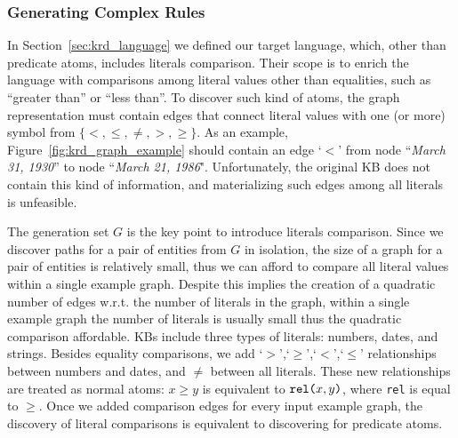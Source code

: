 %
\vspace{-1.5ex}
\subsubsection*{Generating Complex Rules}

\vspace{-1ex}

\vspace{0.5ex}
In Section~\ref{sec:krd_language} we defined our target language, which, other than predicate atoms, includes literals comparison. 
Their scope is to enrich the language with comparisons among literal values other than equalities, such as ``greater than'' or ``less than''. To discover such kind of atoms, the graph representation must contain edges that connect literal values with one (or more) symbol from $\{<,\leq,\neq,>,\geq\}$. As an example, Figure~\ref{fig:krd_graph_example} should contain an edge `$<$' from node ``\textit{March 31, 1930}'' to node ``\textit{March 21, 1986}". Unfortunately, the original KB does not contain this kind of information, and materializing such edges among all literals is unfeasible.

The generation set $G$ is the key point to introduce literals comparison.
Since we discover paths for a pair of entities from $G$ in isolation, the size of a graph for a pair of entities is relatively small, thus we can afford to compare all literal values within a single example graph. Despite this implies the creation of a quadratic number of edges w.r.t. the number of literals in the graph, within a single example graph the number of literals is usually small thus the quadratic comparison affordable. 
KBs include three types of literals: numbers, dates, and strings. Besides equality comparisons, we add `$>$',`$\geq$',`$<$',`$\leq$' relationships between numbers and dates, and $\neq$ between all literals. These new relationships are treated as normal atoms: $x \geq y$ is equivalent to $\texttt{rel(}x,y\texttt{)}$, where \texttt{rel} is equal to $\geq$. Once we added comparison edges for every input example graph, the discovery of literal comparisons is equivalent to discovering for predicate atoms.

